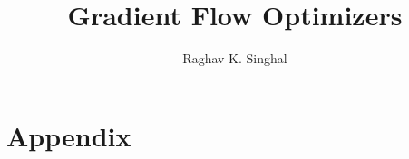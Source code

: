 \documentclass[12pt,twoside]{article}
\date{}   %
\begin{document}
\title{Gradient Flow Optimizers}
\author{Raghav K. Singhal}
\maketitle







% 



\section*{Appendix}




\end{document}
